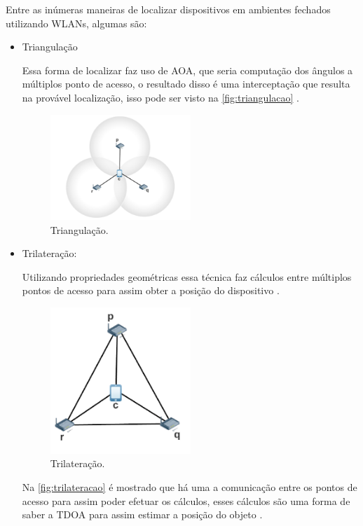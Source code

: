     \par
    Entre as inúmeras maneiras de localizar dispositivos em ambientes fechados utilizando WLANs, algumas são: 
    \begin{itemize}
        \item {Triangulação}
        \par
        Essa forma de localizar faz uso de AOA, que seria computação dos ângulos a múltiplos ponto de acesso, o resultado disso é uma interceptação que resulta na provável localização, isso pode ser visto na \autoref{fig:triangulacao} \cite{wifiFernandes}. 
           \begin{figure}[H]
              \caption{\label{fig:triangulacao}{Triangulação.}}
              \centering
              \includegraphics[width=0.5\textwidth]{Figuras/triangulacao.PNG}
        \end{figure}
        \item {Trilateração: }
        \par 
       Utilizando propriedades geométricas essa técnica faz cálculos entre múltiplos pontos de acesso para assim obter a posição do dispositivo \cite{wifiFernandes}.
        \begin{figure}[H]
              \caption{\label{fig:trilateracao}{Trilateração.}}
              \centering
              \includegraphics[width=0.5\textwidth]{Figuras/trilateracao.PNG}
        \end{figure}
       \par
        Na \autoref{fig:trilateracao} é mostrado que há uma a comunicação entre os pontos de acesso para assim poder efetuar os cálculos, esses cálculos são uma forma de saber a TDOA para assim estimar a posição do objeto \cite{wifiFernandes}.
        

\end{itemize}
